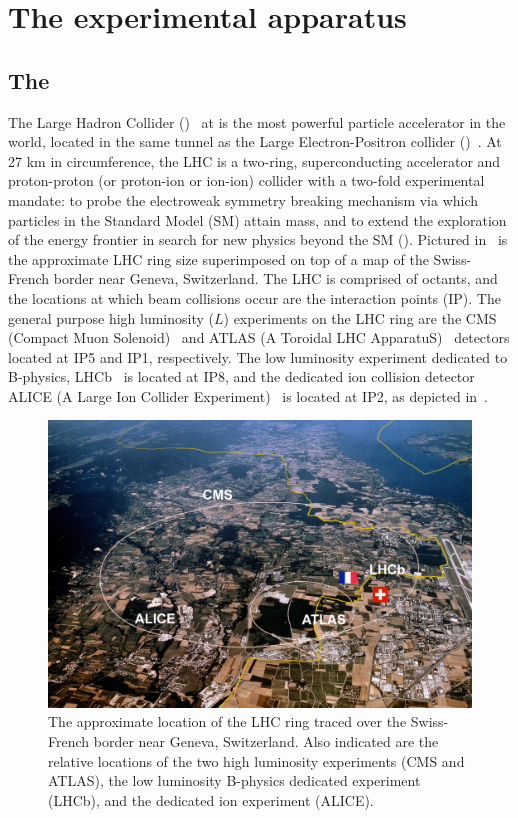 \chapter{The experimental apparatus}
\label{chap:CMS}

\section{The \LHC}
\label{sec:LHC}

The Large Hadron Collider (\LHC)~\cite{Bruning:2004ej} at \CERN is the most powerful particle accelerator in the world, located in the same tunnel as the Large Electron-Positron collider (\LEP)~\cite{Brianti:2004qq}. At 27 km in circumference, the LHC is a two-ring, superconducting accelerator and proton-proton (or proton-ion or ion-ion) collider with a two-fold experimental mandate: to probe the electroweak symmetry breaking mechanism via which particles in the Standard Model (SM) attain mass, and to extend the exploration of the energy frontier in search for new physics beyond the SM (\BSM). Pictured in~ is the approximate LHC ring size superimposed on top of a map of the Swiss-French border near Geneva, Switzerland. The LHC is comprised of octants, and the locations at which beam collisions occur are the interaction points (IP). The general purpose high luminosity ($L$) experiments on the LHC ring are the CMS (Compact Muon Solenoid)~\cite{Chatrchyan:2008aa} and ATLAS (A Toroidal LHC ApparatuS)~\cite{Aad:2008zzm} detectors located at IP5 and IP1, respectively. The low luminosity experiment dedicated to B-physics, LHCb~\cite{Alves:2008zz} is located at IP8, and the dedicated ion collision detector ALICE (A Large Ion Collider Experiment)~\cite{Aamodt:2008zz} is located at IP2, as depicted in~.

\begin{figure}
  \centering
  \includegraphics[width=\textwidth]{figs/lhc.jpg}
  \caption{The approximate location of the LHC ring traced over the Swiss-French border near Geneva, Switzerland. Also indicated are the relative locations of the two high luminosity experiments (CMS and ATLAS), the low luminosity B-physics dedicated experiment (LHCb), and the dedicated ion experiment (ALICE).}
  \label{fig:LHC}
\end{figure}

